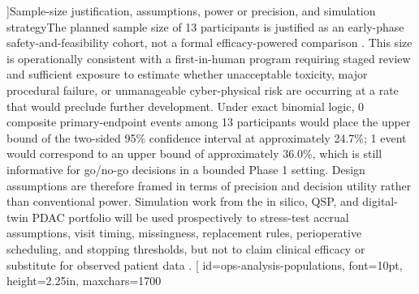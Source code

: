 ]{Sample-size justification, assumptions, power or precision, and simulation strategy}{The planned sample size of 13 participants is justified as an early-phase safety-and-feasibility cohort, not a formal efficacy-powered comparison \citep{phase1ind}. This size is operationally consistent with a first-in-human program requiring staged review and sufficient exposure to estimate whether unacceptable toxicity, major procedural failure, or unmanageable cyber-physical risk are occurring at a rate that would preclude further development. Under exact binomial logic, 0 composite primary-endpoint events among^^J13 participants would place the upper bound of the two-sided 95\% confidence interval at approximately 24.7\%; 1 event would correspond to an upper bound of approximately 36.0\%, which is still informative for go/no-go decisions in a bounded Phase 1 setting. Design assumptions are therefore framed in terms of precision and decision utility rather than conventional power. Simulation work from the in silico, QSP, and digital-twin PDAC portfolio will be used prospectively to stress-test accrual assumptions, visit timing, missingness, replacement rules, perioperative scheduling, and stopping thresholds, but not to claim^^Jclinical efficacy or substitute for observed patient data \citep{qspmetpancre,chatgpt100kp,pdacdigtwinp,fdadigtwinpc}.
}
\GrantTextArea[
  id=ops-analysis-populations, font=10pt, height=2.25in, maxchars=1700

